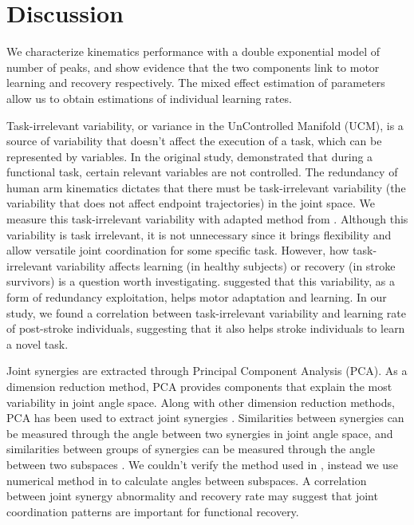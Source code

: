 \section{Discussion}
We characterize kinematics performance with a double exponential model of number of peaks, and show evidence that the two components link to motor learning and recovery respectively. 
The mixed effect estimation of parameters allow us to obtain estimations of individual learning rates.

Task-irrelevant variability, or variance in the UnControlled Manifold (UCM), is a source of variability that doesn’t affect the execution of a task, which can be represented by variables. 
In the original study, \cite{Scholz1999} demonstrated that during a functional task, certain relevant variables are not controlled.
The redundancy of human arm kinematics dictates that there must be task-irrelevant variability (the variability that does not affect endpoint trajectories) in the joint space. 
We measure this task-irrelevant variability with adapted method from \cite{Singh2016}. 
Although this variability is task irrelevant, it is not unnecessary since it brings flexibility and allow versatile joint coordination for some specific task. 
However, how task-irrelevant variability affects learning (in healthy subjects) or recovery (in stroke survivors) is a question worth investigating. 
\cite{Singh2016} suggested that this variability, as a form of redundancy exploitation, helps motor adaptation and learning. 
In our study, we found a correlation between task-irrelevant variability and learning rate of post-stroke individuals, suggesting that it also helps stroke individuals to learn a novel task.

Joint synergies are extracted through Principal Component Analysis (PCA). 
As a dimension reduction method, PCA provides components that explain the most variability in joint angle space. 
Along with other dimension reduction methods, PCA has been used to extract joint synergies \cite{Kordelaar2012}. 
Similarities between synergies can be measured through the angle between two synergies in joint angle space, and similarities between groups of synergies can be measured through the angle between two subspaces \cite{Bockemuehl2010}. 
We couldn’t verify the method used in \cite{Bockemuehl2010}, instead we use numerical method in \cite{Bjoerck1973} to calculate angles between subspaces. 
A correlation between joint synergy abnormality and recovery rate may suggest that joint coordination patterns are important for functional recovery.

